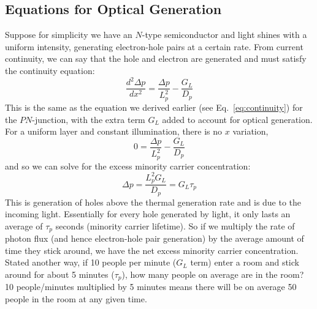\subsection{Equations for Optical Generation}
Suppose for simplicity we have an $N$-type semiconductor and light shines with a uniform intensity, generating electron-hole pairs at a certain rate.   From current continuity, we can say that the hole and electron are generated and must satisfy the continuity equation:
    \begin{equation} 
        \frac{d^2 \Delta p}{dx^2}   = \frac{\Delta p}{L_p^2} - \frac{G_L}{D_p}
    \end{equation}
This is the same as the equation we derived earlier (see Eq.~\ref{eq:continuity}) for the $PN$-junction, with the extra term $G_L$ added to account for optical generation.   For a uniform layer and constant illumination, there is no $x$ variation, 
    \begin{equation} 
        0  = \frac{\Delta p}{L_p^2} - \frac{G_L}{D_p}
    \end{equation}
and so we can solve for the excess minority carrier concentration:
    \begin{equation} 
        \Delta p = \frac{L_p^2 G_L}{D_p} = G_L \tau_p
    \end{equation}
This is generation of holes above the thermal generation rate and is due to the incoming light.  Essentially for every hole generated by light, it only lasts an average of $\tau_p$ seconds (minority carrier lifetime).  So if we multiply the rate of photon flux (and hence electron-hole pair generation) by the average amount of time they stick around, we have the net excess minority carrier concentration.   Stated another way, if 10 people per minute ($G_L$ term) enter a room and stick around for about 5 minutes ($\tau_p$), how many people on average are in the room?   10 people/minutes multiplied by 5 minutes means there will be on average 50 people in the room at any given time.  
